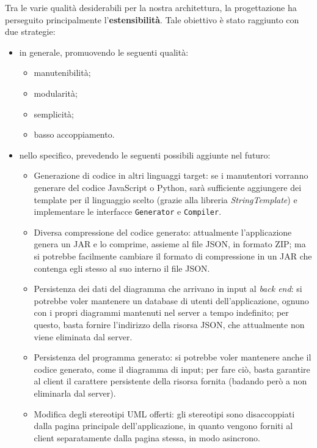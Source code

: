 Tra le varie qualità desiderabili per la nostra architettura, la progettazione ha perseguito principalmente l'\textbf{estensibilità}. Tale obiettivo è stato raggiunto con due strategie:
\begin{itemize}
	\item in generale, promuovendo le seguenti qualità:
	\begin{itemize}
		\item manutenibilità;
		\item modularità;
		\item semplicità;
		\item basso accoppiamento.
	\end{itemize}
	\item nello specifico, prevedendo le seguenti possibili aggiunte nel futuro:
	\begin{itemize}
		\item Generazione di codice in altri linguaggi target: se i manutentori vorranno generare del codice JavaScript o Python, sarà sufficiente aggiungere dei template per il linguaggio scelto (grazie alla libreria \emph{StringTemplate}) e implementare le interfacce \texttt{Generator} e \texttt{Compiler}.
		\item Diversa compressione del codice generato: attualmente l'applicazione genera un JAR e lo comprime, assieme al file JSON, in formato ZIP; ma si potrebbe facilmente cambiare il formato di compressione in un JAR che contenga egli stesso al suo interno il file JSON.
		\item Persistenza dei dati del diagramma che arrivano in input al \emph{back end}: si potrebbe voler mantenere un database di utenti dell'applicazione, ognuno con i propri diagrammi mantenuti nel server a tempo indefinito; per questo, basta fornire l'indirizzo della risorsa JSON, che attualmente non viene eliminata dal server. %
		\item Persistenza del programma generato: si potrebbe voler mantenere anche il codice generato, come il diagramma di input; per fare ciò, basta garantire al client il carattere persistente della risorsa fornita (badando però a non eliminarla dal server). %
		\item Modifica degli stereotipi UML offerti: gli stereotipi sono disaccoppiati dalla pagina principale dell'applicazione, in quanto vengono forniti al client separatamente dalla pagina stessa, in modo asincrono.
	\end{itemize}
\end{itemize}



